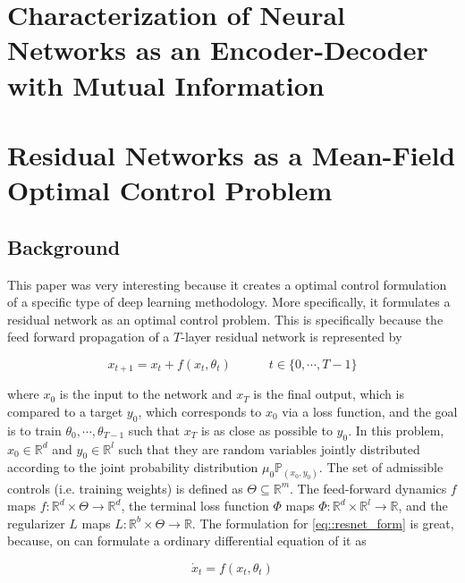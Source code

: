 \section{Characterization of Neural Networks as an Encoder-Decoder with Mutual Information \cite{blackbox}}


\section{Residual Networks as a Mean-Field Optimal Control Problem \cite{meanfield}}


\subsection{Background}
This paper was very interesting because it creates a optimal control formulation of a specific type of deep learning methodology. More specifically, it formulates a residual network as an optimal control problem. This is specifically because the feed forward propagation of a $T$-layer residual network is represented by

\begin{equation} \label{eq::resnet_form}
    x_{t+1} = x_t + f(x_t,\theta_t) \quad \quad \quad t \in \{0,\cdots,T-1\}
\end{equation}

where $x_0$ is the input to the network and $x_T$ is the final output, which is compared to a target $y_0$, which corresponds to $x_0$ via a loss function, and the goal is to train $\theta_0,\cdots,\theta_{T-1}$ such that $x_T$ is as close as possible to $y_0$. In this problem,$x_0 \in \mathbb{R}^d$ and $y_0 \in \mathbb{R}^l$ such that they are random variables jointly distributed according to the joint probability distribution $\mu_0 \mathbb{P}_{(x_0,y_0)}$. The set of admissible controls (i.e. training weights) is defined as $\Theta \subseteq \mathbb{R}^m$. The feed-forward dynamics $f$ maps $f:\mathbb{R}^d \times \Theta \rightarrow \mathbb{R}^d$, the terminal loss function $\Phi$ maps $\Phi : \mathbb{R}^d \times \mathbb{R}^{l} \rightarrow \mathbb{R}$, and the regularizer $L$ maps $L:\mathbb{R}^b \times \Theta \rightarrow \mathbb{R}$. The formulation for \ref{eq::resnet_form} is great, because, on can formulate a ordinary differential equation of it as

\begin{equation} \label{eq::resnet_ode}
    \dot{x}_t = f(x_t,\theta_t)
\end{equation}

